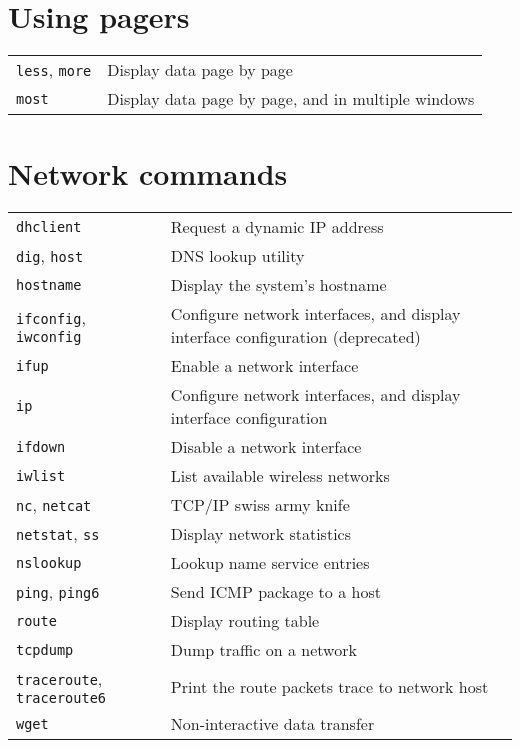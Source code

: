 \documentclass[10pt]{article}
\begin{document}
\begin{multicols}{2}

\section{Using pagers}
\begin{tabular}{ p{2.5cm} p{8.5cm} }
  \hline
  \texttt{less}, \texttt{more} & Display data page by page \\
  \rowcolor{Gray}
  \texttt{most} & Display data page by page, and in multiple windows \\
  \hline
\end{tabular}

\section{Network commands}
\begin{tabular}{ p{2.5cm} p{8.5cm} }
  \hline
  \texttt{dhclient} & Request a dynamic IP address \\
  \rowcolor{Gray}
  \texttt{dig}, \texttt{host} & DNS lookup utility \\
  \texttt{hostname} & Display the system's hostname \\
  \rowcolor{Gray}
  \texttt{ifconfig}, \texttt{iwconfig} & Configure network interfaces, and display interface configuration (deprecated)\\
  \texttt{ifup} & Enable a network interface \\
  \rowcolor{Gray}
  \texttt{ip} & Configure network interfaces, and display interface configuration \\
  \texttt{ifdown} & Disable a network interface \\
  \rowcolor{Gray}
  \texttt{iwlist} & List available wireless networks \\
  \texttt{nc}, \texttt{netcat} & TCP/IP swiss army knife \\
  \rowcolor{Gray}
  \texttt{netstat}, \texttt{ss} & Display network statistics \\
  \texttt{nslookup} & Lookup name service entries \\
  \rowcolor{Gray}
  \texttt{ping}, \texttt{ping6} & Send ICMP package to a host \\
  \texttt{route} & Display routing table \\
  \rowcolor{Gray}
  \texttt{tcpdump} & Dump traffic on a network \\
  \texttt{traceroute}, \texttt{traceroute6} & Print the route packets trace to network host\\
  \rowcolor{Gray}
  \texttt{wget} & Non-interactive data transfer\\
  \hline
\end{tabular}


\end{multicols}
\end{document}
